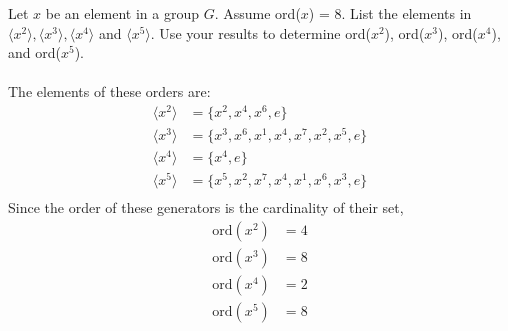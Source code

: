\documentclass[titlepage]{article}
\newenvironment{problem}[2][Problem]{\begin{trivlist}
\item[\hskip \labelsep {\bfseries #1}\hskip \labelsep {\bfseries #2.}]}{\end{trivlist}}
\begin{document}
\begin{problem}{4}
Let $x$ be an element in a group $G$. Assume ord($x$) = 8. List the elements in $\langle x^2\rangle, \langle x^3 \rangle, \langle x^4 \rangle$ and $\langle x^5 \rangle$. Use your results to determine ord($x^2$), ord($x^3$), ord($x^4$), and ord($x^5$).
\\ \\
The elements of these orders are:
\begin{align*}
\langle x^2 \rangle &= \{x^2, x^4, x^6, e\}\\
\langle x^3 \rangle &= \{x^3, x^6, x^1, x^4, x^7, x^2, x^5, e\}\\
\langle x^4 \rangle &= \{x^4, e\}\\
\langle x^5 \rangle &= \{x^5, x^2, x^7, x^4, x^1, x^6, x^3, e\}\\
\end{align*}
Since the order of these generators is the cardinality of their set, 
\begin{align*}
\text{ord}(x^2) &= 4 \\
\text{ord}(x^3) &= 8 \\
\text{ord}(x^4) &= 2 \\
\text{ord}(x^5) &= 8 \\
\end{align*}
\end{problem}
\end{document}
